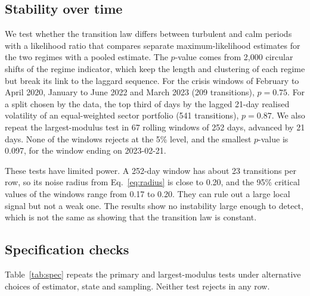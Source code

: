 \documentclass[11pt]{article}
\begin{document}
\subsection{Stability over time}
\label{sec:stability}

We test whether the transition law differs between turbulent and calm periods with a likelihood ratio that compares separate maximum-likelihood estimates for the two regimes with a pooled estimate. The $p$-value comes from 2{,}000 circular shifts of the regime indicator, which keep the length and clustering of each regime but break its link to the laggard sequence. For the crisis windows of February to April 2020, January to June 2022 and March 2023 (209 transitions), $p = 0.75$. For a split chosen by the data, the top third of days by the lagged 21-day realised volatility of an equal-weighted sector portfolio (541 transitions), $p = 0.87$. We also repeat the largest-modulus test in 67 rolling windows of 252 days, advanced by 21 days. None of the windows rejects at the 5\% level, and the smallest $p$-value is 0.097, for the window ending on 2023-02-21.

These tests have limited power. A 252-day window has about 23 transitions per row, so its noise radius from Eq.~\eqref{eq:radius} is close to 0.20, and the 95\% critical values of the windows range from 0.17 to 0.20. They can rule out a large local signal but not a weak one. The results show no instability large enough to detect, which is not the same as showing that the transition law is constant.

\subsection{Specification checks}
\label{sec:spec}

Table~\ref{tab:spec} repeats the primary and largest-modulus tests under alternative choices of estimator, state and sampling. Neither test rejects in any row.
\end{document}
